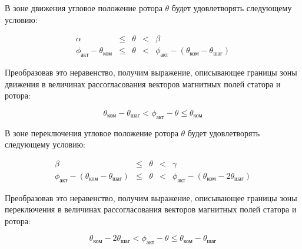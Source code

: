 В зоне движения угловое положение ротора $\theta$ будет удовлетворять следующему условию:

\begin{equation}
    \label{movement_zone_posit_dir_for_curr_pos}
    \begin{array}{ccccc}
        \alpha & \leq & \theta & < & \beta                                         \\
        \phi_\textit{акт} - \theta_\textit{ком}
        & \leq  & \theta
        & <     &\phi_\textit{акт} - (\theta_\textit{ком} - \theta_\textit{шаг})
    \end{array}
\end{equation}

Преобразовав это неравенство, получим выражение, описывающее границы зоны движения
в величинах рассогласования векторов магнитных полей статора и ротора:

\begin{equation}
    \label{movement_zone_posit_dir_for_delta}
    \theta_\textit{ком} - \theta_\textit{шаг}
    < \phi_\textit{акт} - \theta
    \leq \theta_\textit{ком}
\end{equation}

В зоне переключения угловое положение ротора $\theta$ будет удовлетворять следующему условию:

\begin{equation}
    \label{switch_zone_posit_dir_for_curr_pos}
    \begin{array}{ccccc}
        \beta & \leq & \theta & < & \gamma                                         \\
        \phi_\textit{акт} - (\theta_\textit{ком} - \theta_\textit{шаг})
        & \leq  & \theta
        & <     &\phi_\textit{акт} - (\theta_\textit{ком} - 2\theta_\textit{шаг})
    \end{array}
\end{equation}

Преобразовав это неравенство, получим выражение, описывающее границы зоны переключения
в величинах рассогласования векторов магнитных полей статора и ротора:

\begin{equation}
    \label{switch_zone_posit_dir_for_delta}
    \theta_\textit{ком} - 2\theta_\textit{шаг}
    < \phi_\textit{акт} - \theta
    \leq \theta_\textit{ком} - \theta_\textit{шаг}
\end{equation}


